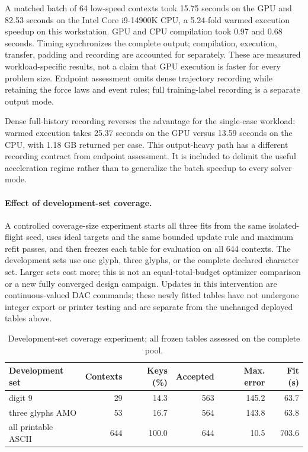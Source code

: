 A matched batch of 64 low-speed contexts took 15.75 seconds on the GPU and 82.53 seconds on the Intel Core i9-14900K CPU, a 5.24-fold warmed execution speedup on this workstation. GPU and CPU compilation took 0.97 and 0.68 seconds. Timing synchronizes the complete output; compilation, execution, transfer, padding and recording are accounted for separately. These are measured workload-specific results, not a claim that GPU execution is faster for every problem size. Endpoint assessment omits dense trajectory recording while retaining the force laws and event rules; full training-label recording is a separate output mode.

Dense full-history recording reverses the advantage for the single-case workload: warmed execution takes 25.37 seconds on the GPU versus 13.59 seconds on the CPU, with 1.18 GB returned per case. This output-heavy path has a different recording contract from endpoint assessment. It is included to delimit the useful acceleration regime rather than to generalize the batch speedup to every solver mode.

\paragraph{Effect of development-set coverage.} A controlled coverage-size experiment starts all three fits from the same isolated-flight seed, uses ideal targets and the same bounded update rule and maximum refit passes, and then freezes each table for evaluation on all 644 contexts. The development sets use one glyph, three glyphs, or the complete declared character set. Larger sets cost more; this is not an equal-total-budget optimizer comparison or a new fully converged design campaign. Updates in this intervention are continuous-valued DAC commands; these newly fitted tables have not undergone integer export or printer testing and are separate from the unchanged deployed tables above.

\begin{table}[htbp]\centering\small\caption{Development-set coverage experiment; all frozen tables assessed on the complete pool.}\begin{tabular}{lrrrrr}\toprule Development set & Contexts & Keys (\%) & Accepted & Max. error & Fit (s)\\\midrule

digit 9 & 29 & 14.3 & 563 & 145.2 & 63.7 \\

three glyphs AMO & 53 & 16.7 & 564 & 143.8 & 63.8 \\

all printable ASCII & 644 & 100.0 & 644 & 10.5 & 703.6 \\

\bottomrule\end{tabular}\end{table}

